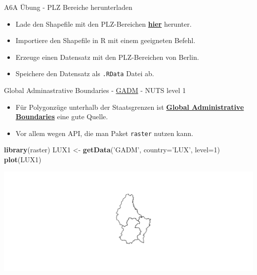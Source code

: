 \documentclass[ignorenonframetext,]{beamer}
\newenvironment{Shaded}{\begin{snugshade}}{\end{snugshade}}
\newcommand{\DataTypeTok}[1]{\textcolor[rgb]{0.13,0.29,0.53}{#1}}
\newcommand{\DecValTok}[1]{\textcolor[rgb]{0.00,0.00,0.81}{#1}}
\newcommand{\KeywordTok}[1]{\textcolor[rgb]{0.13,0.29,0.53}{\textbf{#1}}}
\newcommand{\NormalTok}[1]{#1}
\newcommand{\StringTok}[1]{\textcolor[rgb]{0.31,0.60,0.02}{#1}}
\providecommand{\tightlist}{%
  \setlength{\itemsep}{0pt}\setlength{\parskip}{0pt}}
\begin{document}
\begin{frame}[fragile]{A6A Übung - PLZ Bereiche herunterladen}
\protect\hypertarget{a6a-ubung---plz-bereiche-herunterladen}{}

\begin{itemize}
\tightlist
\item
  Lade den Shapefile mit den PLZ-Bereichen
  \href{http://arnulf.us/PLZ}{\textbf{hier}} herunter.
\item
  Importiere den Shapefile in R mit einem geeigneten Befehl.
\item
  Erzeuge einen Datensatz mit den PLZ-Bereichen von Berlin.
\item
  Speichere den Datensatz als \texttt{.RData} Datei ab.
\end{itemize}

\end{frame}

\begin{frame}[fragile]{Global Adminastrative Boundaries -
\href{http://www.gadm.org/}{GADM} - NUTS level 1}
\protect\hypertarget{global-adminastrative-boundaries---gadm---nuts-level-1}{}

\begin{itemize}
\tightlist
\item
  Für Polygonzüge unterhalb der Staatsgrenzen ist
  \href{http://www.gadm.org/}{\textbf{Global Administrative Boundaries}}
  eine gute Quelle.
\item
  Vor allem wegen API, die man Paket \texttt{raster} nutzen kann.
\end{itemize}

\begin{Shaded}
\begin{Highlighting}[]
\KeywordTok{library}\NormalTok{(raster)}
\NormalTok{LUX1 <-}\StringTok{ }\KeywordTok{getData}\NormalTok{(}\StringTok{'GADM'}\NormalTok{, }\DataTypeTok{country=}\StringTok{'LUX'}\NormalTok{, }\DataTypeTok{level=}\DecValTok{1}\NormalTok{)}
\KeywordTok{plot}\NormalTok{(LUX1)}
\end{Highlighting}
\end{Shaded}

\includegraphics{shapefiles_files/figure-beamer/unnamed-chunk-28-1.pdf}

\end{frame}
\end{document}
